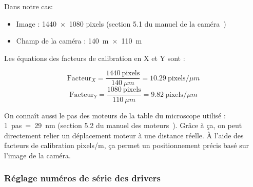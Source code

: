 Dans notre cas:
\begin{itemize}
    \item Image : 1440~$\times$~1080 pixels (section 5.1 du manuel de la caméra~\cite{cameraCS165CU/M})
    \item Champ de la caméra : 140~\textmu m~$\times$~110~\textmu m
\end{itemize}

Les équations des facteurs de calibration en X et Y sont :

\[
    \text{Facteur}_X = \frac{1440\ \text{pixels}}{140\ \mu m} = 10.29\ \text{pixels}/\mu m
\]
\[
    \text{Facteur}_Y = \frac{1080\ \text{pixels}}{110\ \mu m} = 9.82\ \text{pixels}/\mu m
\]

On connaît aussi le pas des moteurs de la table du microscope utilisé : 1~pas~=~29~nm (section 5.2 du manuel des moteurs~\cite{motorZ812B}). Grâce à ça, on peut directement relier un déplacement moteur à une distance réelle. À l'aide des facteurs de calibration pixels/\textmu m, ça permet un positionnement précis basé sur l'image de la caméra.

\subsubsection{Réglage numéros de série des drivers}

